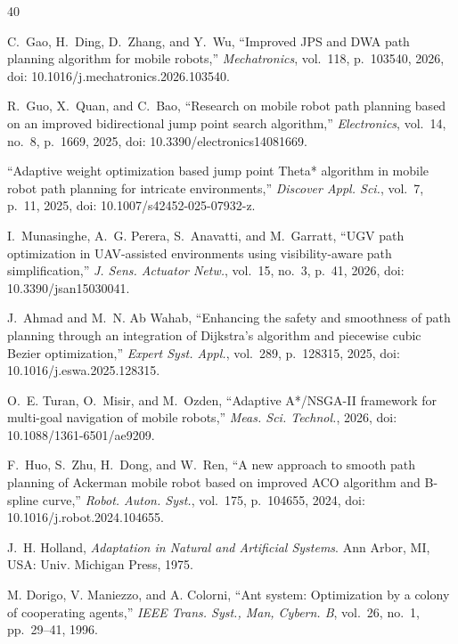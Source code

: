 \begin{thebibliography}{40}

C.~Gao, H.~Ding, D.~Zhang, and Y.~Wu, ``Improved JPS and DWA path planning algorithm for mobile robots,'' \textit{Mechatronics}, vol.~118, p.~103540, 2026, doi: 10.1016/j.mechatronics.2026.103540.



R.~Guo, X.~Quan, and C.~Bao, ``Research on mobile robot path planning based on an improved bidirectional jump point search algorithm,'' \textit{Electronics}, vol.~14, no.~8, p.~1669, 2025, doi: 10.3390/electronics14081669.



``Adaptive weight optimization based jump point Theta* algorithm in mobile robot path planning for intricate environments,'' \textit{Discover Appl. Sci.}, vol.~7, p.~11, 2025, doi: 10.1007/s42452-025-07932-z.



I.~Munasinghe, A.~G. Perera, S.~Anavatti, and M.~Garratt, ``UGV path optimization in UAV-assisted environments using visibility-aware path simplification,'' \textit{J. Sens. Actuator Netw.}, vol.~15, no.~3, p.~41, 2026, doi: 10.3390/jsan15030041.



J.~Ahmad and M.~N. Ab Wahab, ``Enhancing the safety and smoothness of path planning through an integration of Dijkstra's algorithm and piecewise cubic Bezier optimization,'' \textit{Expert Syst. Appl.}, vol.~289, p.~128315, 2025, doi: 10.1016/j.eswa.2025.128315.



O.~E. Turan, O.~Misir, and M.~Ozden, ``Adaptive A*/NSGA-II framework for multi-goal navigation of mobile robots,'' \textit{Meas. Sci. Technol.}, 2026, doi: 10.1088/1361-6501/ae9209.



F.~Huo, S.~Zhu, H.~Dong, and W.~Ren, ``A new approach to smooth path planning of Ackerman mobile robot based on improved ACO algorithm and B-spline curve,'' \textit{Robot. Auton. Syst.}, vol.~175, p.~104655, 2024, doi: 10.1016/j.robot.2024.104655.



J.~H. Holland, \textit{Adaptation in Natural and Artificial Systems}. Ann Arbor, MI, USA: Univ. Michigan Press, 1975.



M. Dorigo, V. Maniezzo, and A. Colorni, ``Ant system: Optimization by a colony of cooperating agents,'' \textit{IEEE Trans. Syst., Man, Cybern. B}, vol.~26, no.~1, pp.~29--41, 1996.



\end{thebibliography}
